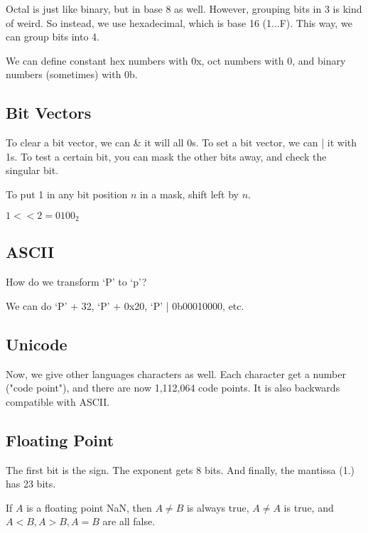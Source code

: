 
Octal is just like binary, but in base 8 as well. However, grouping bits in 3 is kind of weird. So instead, we use hexadecimal, which is base 16 (1...F). This way, we can group bits into 4.

We can define constant hex numbers with 0x, oct numbers with 0, and binary numbers (sometimes) with 0b.

\subsection{Bit Vectors}

To clear a bit vector, we can \& it will all 0s. To set a bit vector, we can | it with 1s. To test a certain bit, you can mask the other bits away, and check the singular bit.

To put 1 in any bit position \( n \) in a mask, shift left by \( n \).

\begin{eg}
	\( 1 << 2 = 0100_2 \)
\end{eg}

\subsection{ASCII}

\begin{eg}
	How do we transform `P' to `p'?
\end{eg}
\begin{explanation}
	We can do `P' + 32, `P' + 0x20, `P' | 0b00010000, etc.
\end{explanation}

\subsection{Unicode}

Now, we give other languages characters as well. Each character get a number ("code point"), and there are now 1,112,064 code points. It is also backwards compatible with ASCII.

\subsection{Floating Point}

The first bit is the sign. The exponent gets 8 bits. And finally, the mantissa (1.) has 23 bits.

If \( A \) is a floating point NaN, then \( A\neq B \) is always true, \( A\neq A \) is true, and \( A<B, A>B, A = B \) are all false.
